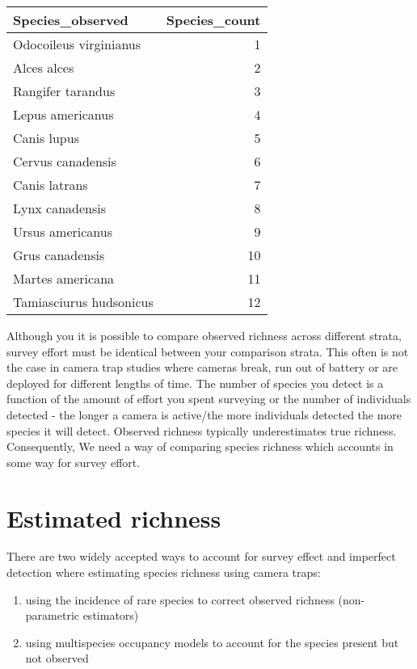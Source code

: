 \documentclass[]{book}
\providecommand{\tightlist}{%
  \setlength{\itemsep}{0pt}\setlength{\parskip}{0pt}}
\begin{document}
\begin{table}
\centering
\begin{tabular}[t]{l|r}
\hline
Species\_observed & Species\_count\\
\hline
Odocoileus virginianus & 1\\
\hline
Alces alces & 2\\
\hline
Rangifer tarandus & 3\\
\hline
Lepus americanus & 4\\
\hline
Canis lupus & 5\\
\hline
Cervus canadensis & 6\\
\hline
Canis latrans & 7\\
\hline
Lynx canadensis & 8\\
\hline
Ursus americanus & 9\\
\hline
Grus canadensis & 10\\
\hline
Martes americana & 11\\
\hline
Tamiasciurus hudsonicus & 12\\
\hline
\end{tabular}
\end{table}

Although you it is possible to compare observed richness across
different strata, survey effort must be identical between your
comparison strata. This often is not the case in camera trap studies
where cameras break, run out of battery or are deployed for different
lengths of time. The number of species you detect is a function of the
amount of effort you spent surveying or the number of individuals
detected - the longer a camera is active/the more individuals detected
the more species it will detect. Observed richness typically
underestimates true richness. Consequently, We need a way of comparing
species richness which accounts in some way for survey effort.

\section{Estimated richness}\label{estimated-richness}

There are two widely accepted ways to account for survey effect and
imperfect detection where estimating species richness using camera
traps:

\begin{enumerate}
\def\labelenumi{\roman{enumi})}
\tightlist
\item
  using the incidence of rare species to correct observed richness
  (non-parametric estimators)
\item
  using multispecies occupancy models to account for the species present
  but not observed
\end{enumerate}
\end{document}
